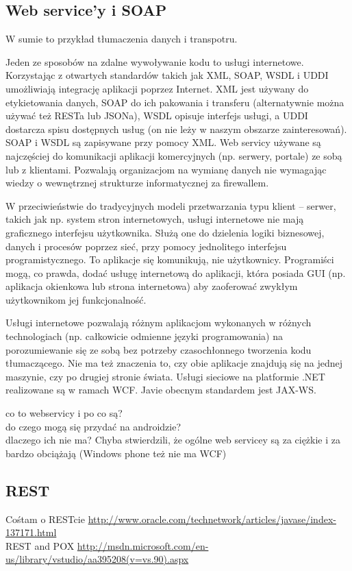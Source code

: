 \documentclass[twoside,a4paper]{book}
\begin{document}
\subsection{Web service'y i SOAP}
W sumie to przykład tłumaczenia danych  i transpotru.

Jeden ze sposobów na zdalne wywoływanie kodu to usługi internetowe. Korzystając z otwartych standardów takich jak XML, SOAP, WSDL i UDDI umożliwiają integrację aplikacji poprzez Internet. XML jest używany do etykietowania danych, SOAP do ich pakowania i transferu (alternatywnie można używać też RESTa lub JSONa), WSDL opisuje interfejs usługi, a UDDI dostarcza spisu dostępnych usług (on nie leży w naszym obszarze zainteresowań). SOAP i WSDL są zapisywane przy pomocy XML. Web servicy używane są najczęściej do komunikacji aplikacji komercyjnych (np. serwery, portale) ze sobą lub z klientami. Pozwalają organizacjom na wymianę danych nie wymagając wiedzy o wewnętrznej strukturze informatycznej za firewallem.

W przeciwieństwie do tradycyjnych modeli przetwarzania typu klient – serwer, takich jak np. system stron internetowych, usługi internetowe nie mają graficznego interfejsu użytkownika. Służą one do dzielenia logiki biznesowej, danych i procesów poprzez sieć, przy pomocy jednolitego interfejsu programistycznego. To aplikacje się komunikują, nie użytkownicy. Programiści mogą, co prawda, dodać usługę internetową do aplikacji, która posiada GUI (np. aplikacja okienkowa lub strona internetowa) aby zaoferować zwykłym użytkownikom jej funkcjonalność.

Usługi internetowe pozwalają różnym aplikacjom wykonanych w różnych technologiach (np. całkowicie odmienne języki programowania) na porozumiewanie się ze sobą bez potrzeby czasochłonnego tworzenia kodu tłumaczącego. Nie ma też znaczenia to, czy obie aplikacje znajdują się na jednej maszynie, czy po drugiej stronie świata.
Usługi sieciowe na platformie .NET realizowane są w ramach WCF. Javie obecnym standardem jest JAX-WS.

co to webservicy i po co są?\\
do czego mogą się przydać na androidzie?\\
dlaczego ich nie ma? Chyba stwierdzili, że ogólne web servicey są za ciężkie i za bardzo obciążają (Windows phone też nie ma WCF)\\

\subsection{REST}
Cośtam o RESTcie \url{http://www.oracle.com/technetwork/articles/javase/index-137171.html}\\
REST and POX \url{http://msdn.microsoft.com/en-us/library/vstudio/aa395208(v=vs.90).aspx}\\
\end{document}

